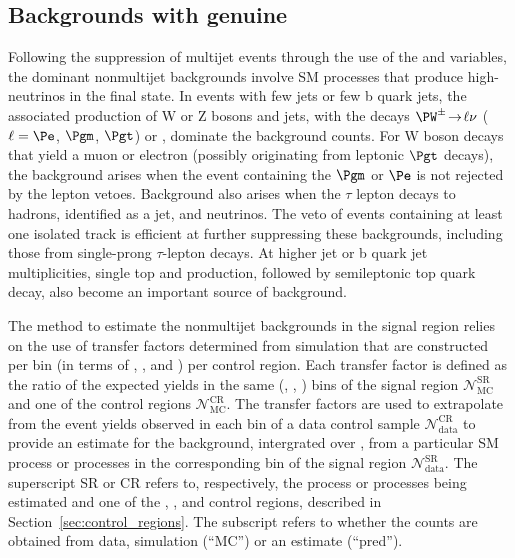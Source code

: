 \subsection{Backgrounds with genuine \texorpdfstring{\ETmiss}{MET}}
\label{sec:ewk_background}

Following the suppression of multijet events through the use of the
\alphat and \bdphi variables, the dominant nonmultijet backgrounds
involve SM processes that produce high-\Pt neutrinos in the final
state. In events with few jets or few b quark jets, the associated
production of W or Z bosons and jets, with the decays $\PW^\pm
\!\rightarrow\! \ell\nu$ ($\ell=\Pe$, $\Pgm$, $\Pgt$) or \znunu,
dominate the background counts. For W boson decays that yield a muon
or electron (possibly originating from leptonic $\Pgt$ decays), the
background arises when the event containing the $\Pgm$ or $\Pe$ is not
rejected by the lepton vetoes. Background also arises when the $\tau$
lepton decays to hadrons, identified as a jet, and neutrinos. The veto
of events containing at least one isolated track is efficient at
further suppressing these backgrounds, including those from
single-prong $\tau$-lepton decays. At higher jet or b quark jet
multiplicities, single top and \ttbar production, followed by
semileptonic top quark decay, also become an important source of
background.

The method to estimate the nonmultijet backgrounds in the signal
region relies on the use of transfer factors determined from
simulation that are constructed per bin (in terms of \njet, \nb, and
\scalht) per control region. Each transfer factor is defined as the
ratio of the expected yields in the same (\njet, \nb, \scalht) bins of
the signal region $\mathcal{N}^\text{SR}_\text{MC}$ and one of the
control regions $\mathcal{N}^\text{CR}_\text{MC}$. The transfer
factors are used to extrapolate from the event yields observed in each
bin of a data control sample $\mathcal{N}^\text{CR}_\text{data}$ to
provide an estimate for the background, intergrated over \HTmiss, from
a particular SM process or processes in the corresponding bin of the
signal region $\mathcal{N}^\text{SR}_\text{data}$. The superscript SR
or CR refers to, respectively, the process or processes being
estimated and one of the \mj, \mmj, and \gj control regions, described
in Section~\ref{sec:control_regions}. The subscript refers to whether
the counts are obtained from data, simulation (``MC'') or an estimate
(``pred'').

